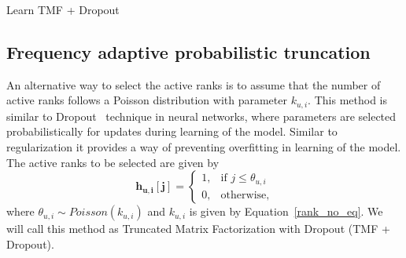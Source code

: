 \begin{algorithm}
  \caption{Learn TMF + Dropout}
  \label{alg:learntmfd}
\end{algorithm}





\subsection{Frequency adaptive probabilistic truncation}

An alternative way to select the active ranks is to assume that the
number of active ranks follows a Poisson distribution with parameter
$k_{u,i}$. 
This method is similar to Dropout~\cite{srivastava2014dropout} technique in neural networks, where parameters
are selected probabilistically for updates during learning of the model.
Similar to regularization it provides a way of preventing overfitting in
learning of the model. 
The active ranks to be selected  are given by
\[
  \bm{h_{u,i}[j]} = 
  \begin{cases}
    1,& \text{if } j \leq \theta_{u,i} \\
    0,& \text{otherwise},
  \end{cases}
\]
\noindent where $\theta_{u,i} \sim Poisson(k_{u,i})$ and $k_{u,i}$ is given by Equation~\ref{rank_no_eq}.
We will call this method as Truncated Matrix Factorization with Dropout (TMF + Dropout).



